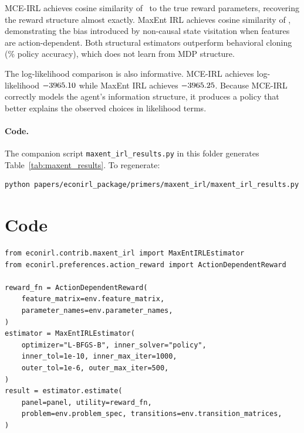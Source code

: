 \documentclass[10pt]{article}
\begin{document}
MCE-IRL achieves cosine similarity of \maxentMceCosine\ to the true reward parameters, recovering the reward structure almost exactly. MaxEnt IRL achieves cosine similarity of \maxentCosine, demonstrating the bias introduced by non-causal state visitation when features are action-dependent. Both structural estimators outperform behavioral cloning (\maxentBcPolicyAcc\% policy accuracy), which does not learn from MDP structure.

The log-likelihood comparison is also informative. MCE-IRL achieves log-likelihood $-3965.10$ while MaxEnt IRL achieves $-3965.25$. Because MCE-IRL correctly models the agent's information structure, it produces a policy that better explains the observed choices in likelihood terms.

\paragraph{Code.}
The companion script \texttt{maxent\_irl\_results.py} in this folder generates Table~\ref{tab:maxent_results}. To regenerate:
\begin{verbatim}
python papers/econirl_package/primers/maxent_irl/maxent_irl_results.py
\end{verbatim}


\section{Code}

{\small
\begin{verbatim}
from econirl.contrib.maxent_irl import MaxEntIRLEstimator
from econirl.preferences.action_reward import ActionDependentReward

reward_fn = ActionDependentReward(
    feature_matrix=env.feature_matrix,
    parameter_names=env.parameter_names,
)
estimator = MaxEntIRLEstimator(
    optimizer="L-BFGS-B", inner_solver="policy",
    inner_tol=1e-10, inner_max_iter=1000,
    outer_tol=1e-6, outer_max_iter=500,
)
result = estimator.estimate(
    panel=panel, utility=reward_fn,
    problem=env.problem_spec, transitions=env.transition_matrices,
)
\end{verbatim}
}




\end{document}
